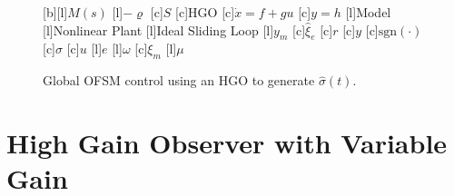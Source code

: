 \documentclass{rncauth}
\begin{document}
\begin{figure}[thpb]
  \begin{center}
  [b][l]{\scriptsize $M(s)$}
  [l]{\scriptsize $-\varrho$}
  [c]{\scriptsize $S$}
  [c]{\scriptsize HGO}
  [c]{\tiny $\dot{x}\!\!=\!\!f\!\!+\!\!gu$}
  [c]{\tiny $y\!\!=\!\!h$}
  [l]{\scriptsize Model}
  [l]{\scriptsize Nonlinear Plant}
  [l]{\scriptsize Ideal Sliding Loop}
  [l]{\scriptsize $y_m$}
  [c]{\scriptsize $\hat{\xi}_e$}
  [c]{\scriptsize $r$}
  [c]{\scriptsize $y$}
  [c]{\scriptsize $\mbox{sgn}(\cdot)$}
  [c]{\scriptsize $\hat{\sigma}$}
  [c]{\scriptsize $u$}
  [l]{\scriptsize $e$}
  [l]{\tiny $\omega$}
  [c]{\tiny $\xi_m$}
  [l]{\tiny $\mu$}
  \caption{Global OFSM control using an HGO to generate $\hat{\sigma}(t)$.}
  \label{fig:vsmrachgoscheme}
  \end{center}
\end{figure}


\section{High Gain Observer with Variable Gain}
\label{sec:HGO}
\end{document}
